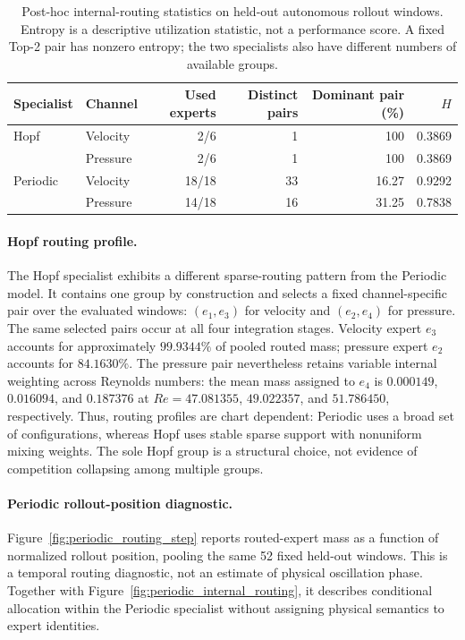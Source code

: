 \begin{table}[htbp]
\centering
\caption{Post-hoc internal-routing statistics on held-out autonomous rollout
windows. Entropy is a descriptive utilization statistic, not a performance
score. A fixed Top-2 pair has nonzero entropy; the two specialists also have
different numbers of available groups.}
\label{tab:internal_routing_summary}
\small
\setlength{\tabcolsep}{5pt}
\begin{tabular}{@{}llrrrr@{}}
\toprule
Specialist & Channel & Used experts & Distinct pairs & Dominant pair (\%) & $H$ \\
\midrule
Hopf & Velocity & 2/6 & 1 & 100 & 0.3869 \\
     & Pressure & 2/6 & 1 & 100 & 0.3869 \\
\addlinespace
Periodic & Velocity & 18/18 & 33 & 16.27 & 0.9292 \\
         & Pressure & 14/18 & 16 & 31.25 & 0.7838 \\
\bottomrule
\end{tabular}
\end{table}

\paragraph{Hopf routing profile.}
The Hopf specialist exhibits a different sparse-routing pattern from the
Periodic model. It contains one group by construction and selects a fixed
channel-specific pair over the evaluated windows: $(e_1,e_3)$ for velocity
and $(e_2,e_4)$ for pressure. The same selected pairs occur at all four
integration stages. Velocity expert $e_3$ accounts for approximately
$99.9344\%$ of pooled routed mass; pressure expert $e_2$ accounts for
$84.1630\%$. The pressure pair nevertheless retains variable internal
weighting across Reynolds numbers: the mean mass assigned to $e_4$ is
$0.000149$, $0.016094$, and $0.187376$ at
$Re=47.081355$, $49.022357$, and $51.786450$, respectively.
Thus, routing profiles are chart dependent: Periodic uses a broad set of
configurations, whereas Hopf uses stable sparse support with nonuniform
mixing weights. The sole Hopf group is a structural choice, not evidence of
competition collapsing among multiple groups.

\paragraph{Periodic rollout-position diagnostic.}
Figure~\ref{fig:periodic_routing_step} reports routed-expert mass as a function
of normalized rollout position, pooling the same 52 fixed held-out windows.
This is a temporal routing diagnostic, not an estimate of physical oscillation
phase. Together with Figure~\ref{fig:periodic_internal_routing}, it describes
conditional allocation within the Periodic specialist without assigning
physical semantics to expert identities.

